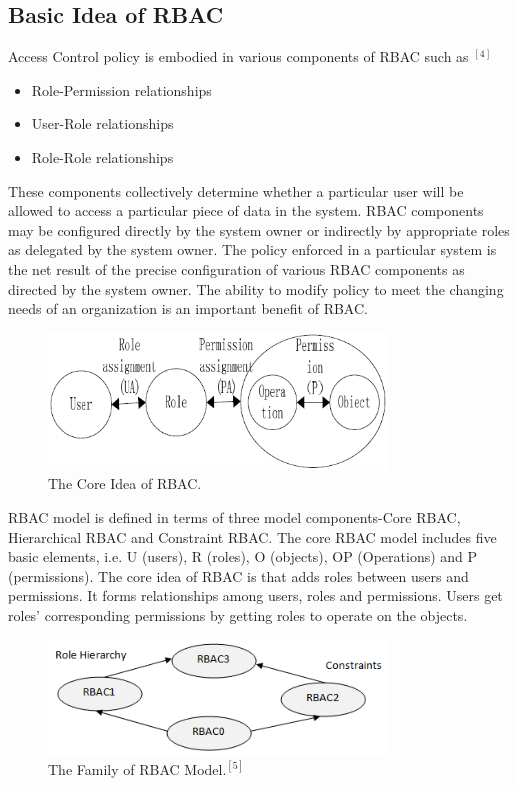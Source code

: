 \documentclass[12pt]{report}
\begin{document}
	\subsection{Basic Idea of RBAC}
		Access Control policy is embodied in various components of RBAC such as $ ^{[4]}$
		\begin{itemize}
		\item Role-Permission relationships
		\item User-Role relationships
		\item Role-Role relationships
		\end{itemize}
		
		 These components collectively determine whether a particular user will be allowed to access a particular piece of data in the system. RBAC components may be configured directly by the system owner or indirectly by appropriate roles as delegated by the system owner. The policy enforced in a particular system is the net result of the precise configuration of various RBAC components as directed by the system owner. The ability to modify policy to meet the changing needs of an organization is an important benefit of RBAC.
		\begin{figure}[H]
		\begin{center}
		\includegraphics[width=9cm]{./4-2.png}
		\caption{ The Core Idea of RBAC. \label{fig:The Core Idea of RBAC. }}
		\end{center}
		\end{figure}
		RBAC model is defined in terms of three model components-Core RBAC, Hierarchical RBAC and Constraint RBAC. The core RBAC model includes five basic elements, i.e. U (users), R (roles), O (objects), OP (Operations) and P (permissions). The core idea of RBAC is that adds roles between users and permissions. It forms relationships among users, roles and permissions. Users get roles’ corresponding permissions by getting roles to operate on the objects.
		\begin{figure}[H]
		\begin{center}
		\includegraphics[width=9cm]{./4-3.png}
		\caption{ The Family of RBAC Model.$ ^{[5]}$ \label{fig:The Family of RBAC Model. }}
		\end{center}
		\end{figure}
	\newpage	
\end{document}
